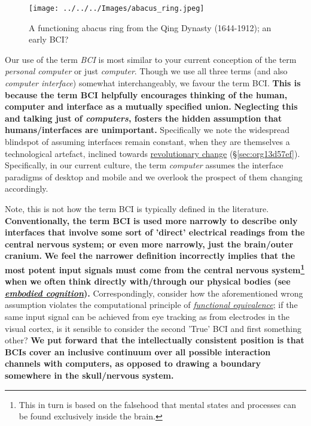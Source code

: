 \documentclass[logo,bsc,singlespacing,parskip]{infthesis}
\begin{document}
\begin{wrapfigure}{r}{0.55\textwidth}
\centering
\texttt{[image: ../../../Images/abacus\_ring.jpeg]}
\caption[Abacus ring; an early BCI]{A functioning abacus ring from the Qing Dynasty (1644-1912); an early BCI?}
\end{wrapfigure}

Our use of the term \emph{BCI} is most similar to your current conception of the term \emph{personal computer} or just \emph{computer}.
Though we use all three terms (and also \emph{computer interface}) somewhat interchangeably, we favour the term BCI.
\textbf{This is because the term BCI helpfully encourages thinking of the human, computer and interface as a mutually specified union.}
\textbf{Neglecting this and talking just of \emph{computers}, fosters the hidden assumption that humans/interfaces are unimportant.}
Specifically we note the widespread blindspot of assuming interfaces remain constant, when they are themselves a technological artefact, inclined towards \hyperref[sec:org13d57ef]{revolutionary change} (\S \ref{sec:org13d57ef}).
Specifically, in our current culture, the term \emph{computer} assumes the interface paradigms of desktop and mobile and we overlook the prospect of them changing accordingly.

Note, this is not how the term BCI is typically defined in the literature.
\textbf{Conventionally, the term BCI is used more narrowly to describe only interfaces that involve some sort of 'direct' electrical readings from the central nervous system; or even more narrowly, just the brain/outer cranium.}
\textbf{We feel the narrower definition incorrectly implies that the most potent input signals must come from the central nervous system\footnote{This in turn is based on the falsehood that mental states and processes can be found exclusively inside the brain.} when we often think directly with/through our physical bodies (see \emph{\hyperref[org68031b0]{embodied cognition}}).}
Correspondingly, consider how the aforementioned wrong assumption violates the computational principle of \emph{\hyperref[orgb2d01c7]{functional equivalence}}; if the same input signal can be achieved from eye tracking as from electrodes in the visual cortex, is it sensible to consider the second 'True' BCI and first something other?
\textbf{We put forward that the intellectually consistent position is that BCIs cover an inclusive continuum over all possible interaction channels with computers, as opposed to drawing a boundary somewhere in the skull/nervous system.}
\end{document}
